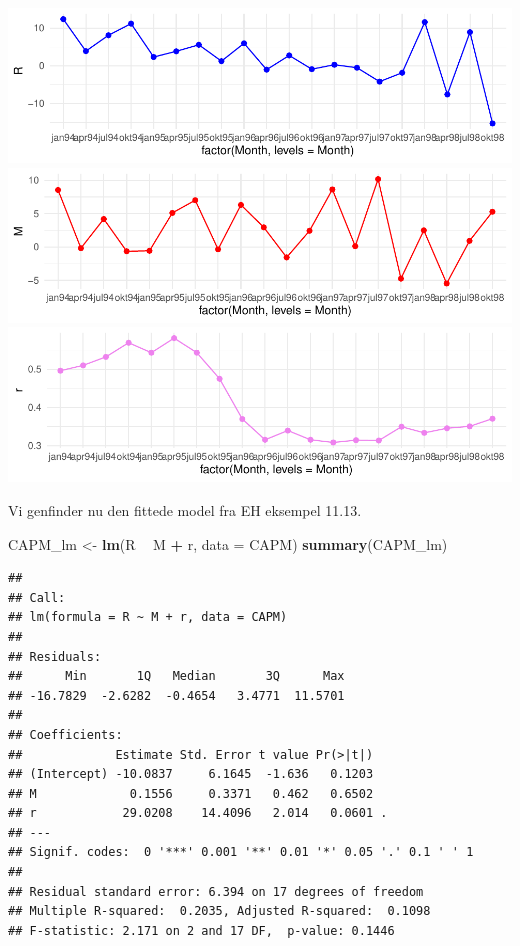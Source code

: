 \documentclass[
]{article}
\newenvironment{Shaded}{\begin{snugshade}}{\end{snugshade}}
\newcommand{\DataTypeTok}[1]{\textcolor[rgb]{0.13,0.29,0.53}{#1}}
\newcommand{\KeywordTok}[1]{\textcolor[rgb]{0.13,0.29,0.53}{\textbf{#1}}}
\newcommand{\NormalTok}[1]{#1}
\newcommand{\OperatorTok}[1]{\textcolor[rgb]{0.81,0.36,0.00}{\textbf{#1}}}
\newcommand{\StringTok}[1]{\textcolor[rgb]{0.31,0.60,0.02}{#1}}
\begin{document}
\includegraphics{matstatproblems20-21_files/figure-latex/unnamed-chunk-89-1.pdf}
\includegraphics{matstatproblems20-21_files/figure-latex/unnamed-chunk-89-2.pdf}
\includegraphics{matstatproblems20-21_files/figure-latex/unnamed-chunk-89-3.pdf}

Vi genfinder nu den fittede model fra EH eksempel 11.13.

\begin{Shaded}
\begin{Highlighting}[]
\NormalTok{CAPM_lm <-}\StringTok{ }\KeywordTok{lm}\NormalTok{(R }\OperatorTok{~}\StringTok{ }\NormalTok{M }\OperatorTok{+}\StringTok{ }\NormalTok{r, }\DataTypeTok{data =}\NormalTok{ CAPM)}
\KeywordTok{summary}\NormalTok{(CAPM_lm)}
\end{Highlighting}
\end{Shaded}

\begin{verbatim}
## 
## Call:
## lm(formula = R ~ M + r, data = CAPM)
## 
## Residuals:
##      Min       1Q   Median       3Q      Max 
## -16.7829  -2.6282  -0.4654   3.4771  11.5701 
## 
## Coefficients:
##             Estimate Std. Error t value Pr(>|t|)  
## (Intercept) -10.0837     6.1645  -1.636   0.1203  
## M             0.1556     0.3371   0.462   0.6502  
## r            29.0208    14.4096   2.014   0.0601 .
## ---
## Signif. codes:  0 '***' 0.001 '**' 0.01 '*' 0.05 '.' 0.1 ' ' 1
## 
## Residual standard error: 6.394 on 17 degrees of freedom
## Multiple R-squared:  0.2035, Adjusted R-squared:  0.1098 
## F-statistic: 2.171 on 2 and 17 DF,  p-value: 0.1446
\end{verbatim}
\end{document}
